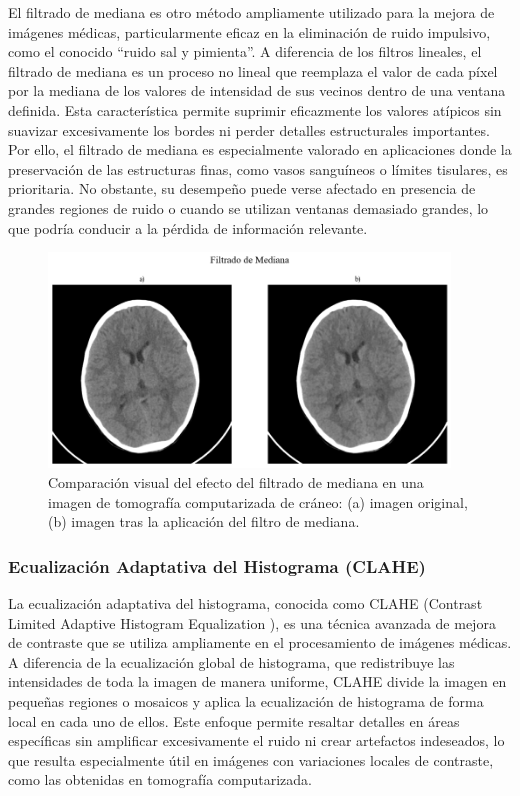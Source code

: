 El filtrado de mediana es otro método ampliamente utilizado para la mejora de imágenes médicas, particularmente eficaz en la eliminación de ruido impulsivo, como el conocido ``ruido sal y pimienta''. A diferencia de los filtros lineales, el filtrado de mediana es un proceso no lineal que reemplaza el valor de cada píxel por la mediana de los valores de intensidad de sus vecinos dentro de una ventana definida. Esta característica permite suprimir eficazmente los valores atípicos sin suavizar excesivamente los bordes ni perder detalles estructurales importantes. Por ello, el filtrado de mediana es especialmente valorado en aplicaciones donde la preservación de las estructuras finas, como vasos sanguíneos o límites tisulares, es prioritaria. No obstante, su desempeño puede verse afectado en presencia de grandes regiones de ruido o cuando se utilizan ventanas demasiado grandes, lo que podría conducir a la pérdida de información relevante\cite{ImageProcessingBook}.

\begin{figure}[H]
    \centering
    \includegraphics[width=0.95\textwidth]{Graphics/median-filter.png}
    \caption{Comparación visual del efecto del filtrado de mediana en una imagen de tomografía computarizada de cráneo: (a) imagen original, (b) imagen tras la aplicación del filtro de mediana.}
    \label{fig:filter-median}
\end{figure}

\subsubsection{Ecualización Adaptativa del Histograma (CLAHE)}

La ecualización adaptativa del histograma, conocida como CLAHE (Contrast Limited Adaptive Histogram Equalization \cite{CLAHE}), es una técnica avanzada de mejora de contraste que se utiliza ampliamente en el procesamiento de imágenes médicas. A diferencia de la ecualización global de histograma, que redistribuye las intensidades de toda la imagen de manera uniforme, CLAHE divide la imagen en pequeñas regiones o mosaicos y aplica la ecualización de histograma de forma local en cada uno de ellos. Este enfoque permite resaltar detalles en áreas específicas sin amplificar excesivamente el ruido ni crear artefactos indeseados, lo que resulta especialmente útil en imágenes con variaciones locales de contraste, como las obtenidas en tomografía computarizada.


